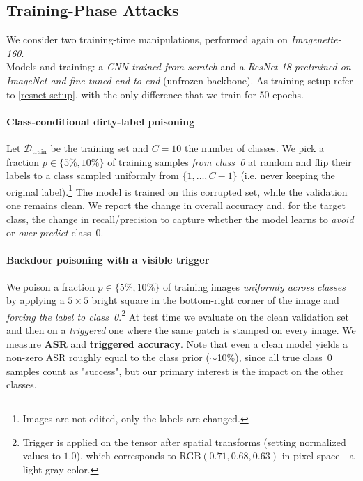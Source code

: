 \documentclass{article}
\begin{document}
\subsection{Training-Phase Attacks}
We consider two training-time manipulations, performed again on \textit{Imagenette-160}.\\
Models and training: a \emph{CNN trained from scratch} and a \emph{ResNet-18 pretrained on ImageNet and fine-tuned end-to-end} (unfrozen backbone). As training setup refer to \ref{resnet-setup}, with the only difference that we train for 50 epochs.

\paragraph{Class-conditional dirty-label poisoning}
Let $\mathcal{D}_{\text{train}}$ be the training set and $C{=}10$ the number of classes. We pick a fraction $p\in\{5\%,10\%\}$ of training samples \emph{from class~0} at random and flip their labels to a class sampled uniformly from $\{1,\dots,C-1\}$ (i.e. never keeping the original label).\footnote{Images are not edited, only the labels are changed.} The model is trained on this corrupted set, while the validation one remains clean. We report the change in overall accuracy and, for the target class, the change in recall/precision to capture whether the model learns to \emph{avoid} or \emph{over-predict} class~0.

\paragraph{Backdoor poisoning with a visible trigger}\label{sec:backdoor-trigger}
We poison a fraction $p\in\{5\%,10\%\}$ of training images \emph{uniformly across classes} by applying a $5{\times}5$ bright square in the bottom-right corner of the image and \emph{forcing the label to class~0}.\footnote{Trigger is applied on the tensor after spatial transforms (setting normalized values to $1.0$), which corresponds to RGB$(0.71, 0.68, 0.63)$ in pixel space—a light gray color.} At test time we evaluate on the clean validation set and then on a \emph{triggered} one where the same patch is stamped on every image. We measure \textbf{ASR} and \textbf{triggered accuracy}. Note that even a clean model yields a non-zero ASR roughly equal to the class prior ($\sim$10\%), since all true class~0 samples count as "success", but our primary interest is the impact on the other classes.


\end{document}
